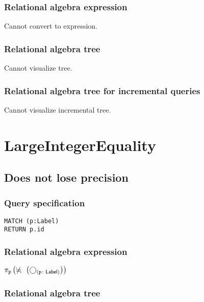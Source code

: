 \subsubsection*{Relational algebra expression}

Cannot convert to expression.

\subsubsection*{Relational algebra tree}

Cannot visualize tree.

\subsubsection*{Relational algebra tree for incremental queries}

Cannot visualize incremental tree.

\section{LargeIntegerEquality}

\subsection{Does not lose precision}

\subsubsection*{Query specification}

\begin{lstlisting}
MATCH (p:Label)
RETURN p.id
\end{lstlisting}

\subsubsection*{Relational algebra expression}

$\projection{\var{p}} \left(\alldifferent{} \left(\getvertices{p}{Label}\right)\right)$

\subsubsection*{Relational algebra tree}


